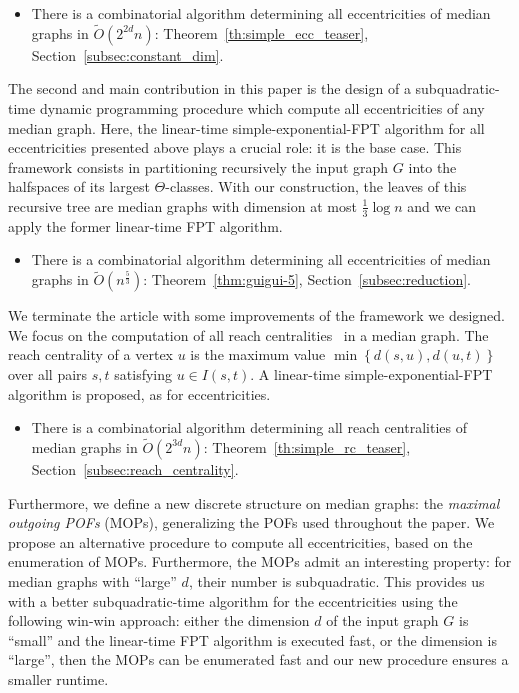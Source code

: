 \documentclass[a4paper,UKenglish,numberwithinsect,cleveref, autoref]{lipics-v2021}
\newcommand{\set}[1]{\left\{ #1 \right\}}
\begin{document}
\begin{itemize}
\item There is a combinatorial algorithm determining all eccentricities of median graphs in $\tilde{O}(2^{2d}n)$: Theorem~\ref{th:simple_ecc_teaser}, Section~\ref{subsec:constant_dim}.
\end{itemize}

The second and main contribution in this paper is the design of a subquadratic-time dynamic programming procedure which compute all eccentricities of any median graph. Here, the linear-time simple-exponential-FPT algorithm for all eccentricities presented above plays a crucial role: it is the base case. This framework consists in partitioning recursively the input graph $G$ into the halfspaces of its largest $\Theta$-classes. With our construction, the leaves of this recursive tree are median graphs with dimension at most $\frac{1}{3}\log n$ and we can apply the former linear-time FPT algorithm.

\begin{itemize}
    \item There is a combinatorial algorithm determining all eccentricities of median graphs in $\tilde{O}(n^{\frac{5}{3}})$: Theorem~\ref{thm:guigui-5}, Section~\ref{subsec:reduction}.
\end{itemize}

We terminate the article with some improvements of the framework we designed. We focus on the computation of all reach centralities~\cite{Gu04} in a median graph. The reach centrality of a vertex $u$ is the maximum value $\min \set{d(s,u),d(u,t)}$ over all pairs $s,t$ satisfying $u \in I(s,t)$. A linear-time simple-exponential-FPT algorithm is proposed, as for eccentricities.

\begin{itemize}
    \item There is a combinatorial algorithm determining all reach centralities of median graphs in $\tilde{O}(2^{3d}n)$: Theorem~\ref{th:simple_rc_teaser}, Section~\ref{subsec:reach_centrality}.
\end{itemize}

Furthermore, we define a new discrete structure on median graphs: the \textit{maximal outgoing POFs} (MOPs), generalizing the POFs used throughout the paper. We propose an alternative procedure to compute all eccentricities, based on the enumeration of MOPs. Furthermore, the MOPs admit an interesting property: for median graphs with ``large'' $d$, their number is subquadratic. This provides us with a better subquadratic-time algorithm for the eccentricities using the following win-win approach: either the dimension $d$ of the input graph $G$ is ``small'' and the linear-time FPT algorithm is executed fast, or the dimension is ``large'', then the MOPs can be enumerated fast and our new procedure ensures a smaller runtime.
\end{document}
